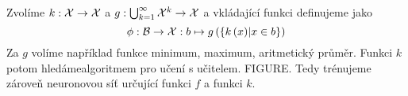 Zvolíme \( k : \mathcal X \to \mathcal X \) a \( g : \bigcup_{k = 1}^{\infty} \mathcal X^k \to \mathcal X \) a vkládající funkci definujeme jako
\begin{equation}
	\phi : \mathcal B \to \mathcal X : b \mapsto g \left( \left\{ k \left( x \right) \middle| x \in b \right\} \right)
\end{equation}
Za \( g \) volíme například funkce minimum, maximum, aritmetický průměr. Funkci \( k \) potom hledámealgoritmem pro učení s učitelem. FIGURE. Tedy trénujeme zároveň neuronovou síť určující funkci \( f \) a funkci \( k \).
